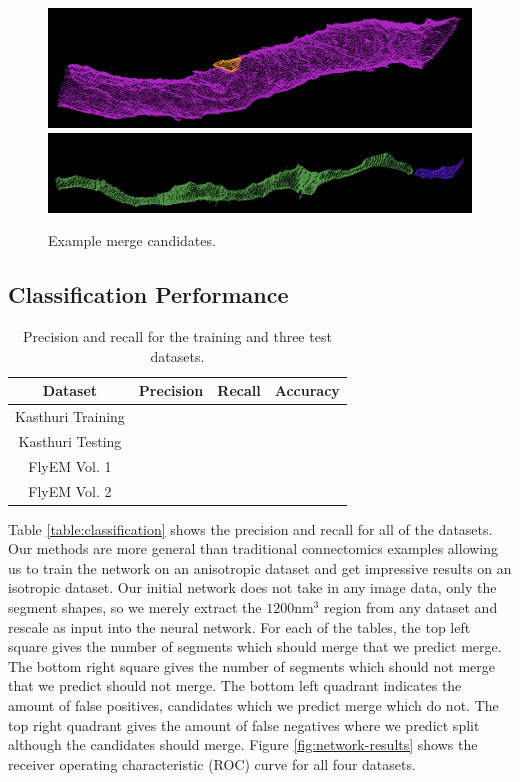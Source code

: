 \begin{figure}[t!]
	\centering
	\includegraphics[width=0.85\linewidth]{./figures/merge_candidate1.png}
	\includegraphics[width=0.85\linewidth]{./figures/merge_candidate2.png}
	\caption{Example merge candidates.}
	\label{fig:skeleton-results}
\end{figure}


\subsection{Classification Performance}

\begin{table}
	\centering
	\begin{tabular}{c c c c} \hline
	\textbf{Dataset} & \textbf{Precision} & \textbf{Recall} & \textbf{Accuracy} \\ \hline
	Kasthuri Training & & & \\
	Kasthuri Testing & & & \\
	FlyEM Vol. 1 & & & \\
	FlyEM Vol. 2 & & & \\ \hline
	\end{tabular}
	\caption{Precision and recall for the training and three test datasets.}
	\label{fig:classification}
\end{table}

Table \ref{table:classification} shows the precision and recall for all of the datasets. Our methods are more general than traditional connectomics examples allowing us to train the network on an anisotropic dataset and get impressive results on an isotropic dataset. Our initial network does not take in any image data, only the segment shapes, so we merely extract the $1200 \textrm{nm}^3$ region from any dataset and rescale as input into the neural network. For each of the tables, the top left square gives the number of segments which should merge that we predict merge. The bottom right square gives the number of segments which should not merge that we predict should not merge. The bottom left quadrant indicates the amount of false positives, candidates which we predict merge which do not. The top right quadrant gives the amount of false negatives where we predict split although the candidates should merge. Figure \ref{fig:network-results} shows the receiver operating characteristic (ROC) curve for all four datasets. 

